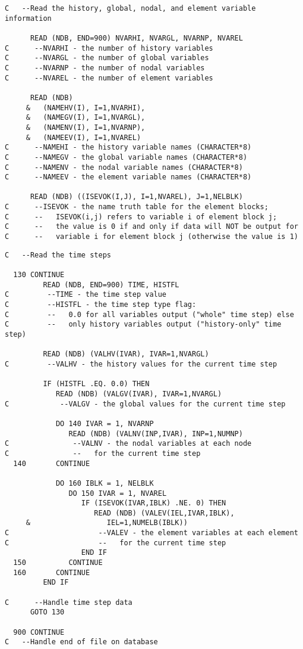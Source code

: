\newpage
\begin{verbatim}
C   --Read the history, global, nodal, and element variable information

      READ (NDB, END=900) NVARHI, NVARGL, NVARNP, NVAREL
C      --NVARHI - the number of history variables
C      --NVARGL - the number of global variables
C      --NVARNP - the number of nodal variables
C      --NVAREL - the number of element variables

      READ (NDB)
     &   (NAMEHV(I), I=1,NVARHI),
     &   (NAMEGV(I), I=1,NVARGL),
     &   (NAMENV(I), I=1,NVARNP),
     &   (NAMEEV(I), I=1,NVAREL)
C      --NAMEHI - the history variable names (CHARACTER*8)
C      --NAMEGV - the global variable names (CHARACTER*8)
C      --NAMENV - the nodal variable names (CHARACTER*8)
C      --NAMEEV - the element variable names (CHARACTER*8)

      READ (NDB) ((ISEVOK(I,J), I=1,NVAREL), J=1,NELBLK)
C      --ISEVOK - the name truth table for the element blocks;
C      --   ISEVOK(i,j) refers to variable i of element block j;
C      --   the value is 0 if and only if data will NOT be output for
C      --   variable i for element block j (otherwise the value is 1)
\end{verbatim}
\newpage
\begin{verbatim}
C   --Read the time steps

  130 CONTINUE
         READ (NDB, END=900) TIME, HISTFL
C         --TIME - the time step value
C         --HISTFL - the time step type flag:
C         --   0.0 for all variables output ("whole" time step) else
C         --   only history variables output ("history-only" time step)

         READ (NDB) (VALHV(IVAR), IVAR=1,NVARGL)
C         --VALHV - the history values for the current time step

         IF (HISTFL .EQ. 0.0) THEN
            READ (NDB) (VALGV(IVAR), IVAR=1,NVARGL)
C            --VALGV - the global values for the current time step

            DO 140 IVAR = 1, NVARNP
               READ (NDB) (VALNV(INP,IVAR), INP=1,NUMNP)
C               --VALNV - the nodal variables at each node
C               --   for the current time step
  140       CONTINUE

            DO 160 IBLK = 1, NELBLK
               DO 150 IVAR = 1, NVAREL
                  IF (ISEVOK(IVAR,IBLK) .NE. 0) THEN
                     READ (NDB) (VALEV(IEL,IVAR,IBLK),
     &                  IEL=1,NUMELB(IBLK))
C                     --VALEV - the element variables at each element
C                     --   for the current time step
                  END IF
  150          CONTINUE
  160       CONTINUE
         END IF

C      --Handle time step data
      GOTO 130

  900 CONTINUE
C   --Handle end of file on database
\end{verbatim}

